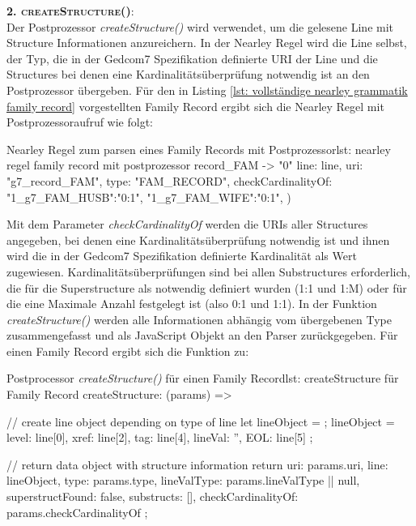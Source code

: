 \textsc{\textbf{2. createStructure()}:} \vspace{0.5em} \\
Der Postprozessor \textit{createStructure()} wird verwendet, um die gelesene Line mit Structure Informationen anzureichern. In der Nearley Regel wird die Line selbst, der Typ, die in der Gedcom7 Spezifikation definierte URI der Line und die Structures bei denen eine Kardinalitätsüberprüfung notwendig ist an den Postprozessor übergeben. Für den in Listing \ref{lst: vollständige nearley grammatik family record} vorgestellten Family Record ergibt sich die Nearley Regel mit Postprozessoraufruf wie folgt:
\vspace{1em}
\begin{javascript}{Nearley Regel zum parsen eines Family Records mit Postprozessor}{lst: nearley regel family record mit postprozessor}
	record_FAM
		-> "0"  %
		 	{%
				line: line,
				uri: "g7_record_FAM", 
				type: "FAM_RECORD", 
				checkCardinalityOf: {
					"1_g7_FAM_HUSB":"0:1", 
					"1_g7_FAM_WIFE":"0:1",
				}
			}) %
\end{javascript}
\vspace{1em}
Mit dem Parameter \textit{checkCardinalityOf} werden die URIs aller Structures angegeben, bei denen eine Kardinalitätsüberprüfung notwendig ist und ihnen wird die in der Gedcom7 Spezifikation definierte Kardinalität als Wert zugewiesen. Kardinalitätsüberprüfungen sind bei allen Substructures erforderlich, die für die Superstructure als notwendig definiert wurden (1:1 und 1:M) oder für die eine Maximale Anzahl festgelegt ist (also 0:1 und 1:1). In der Funktion \textit{createStructure()} werden alle Informationen abhängig vom übergebenen Type zusammengefasst und als JavaScript Objekt an den Parser zurückgegeben. Für einen Family Record ergibt sich die Funktion zu:
\vspace{1em}
\begin{javascript}{Postprocessor \textit{createStructure()} für einen Family Record}{lst: createStructure für Family Record}
	createStructure: (params) => {
		// create line object depending on type of line
		let lineObject = {};
		lineObject = { 
			level: line[0], 
			xref: line[2], 
			tag: line[4], 
			lineVal: '', 
			EOL: line[5] 
		};
		
		// return data object with structure information
		return {
			uri: params.uri,
			line: lineObject,
			type: params.type,
			lineValType: params.lineValType || null,
			superstructFound: false,
			substructs: [],
			checkCardinalityOf: params.checkCardinalityOf
		};
	}
\end{javascript}
\vspace{1em}


